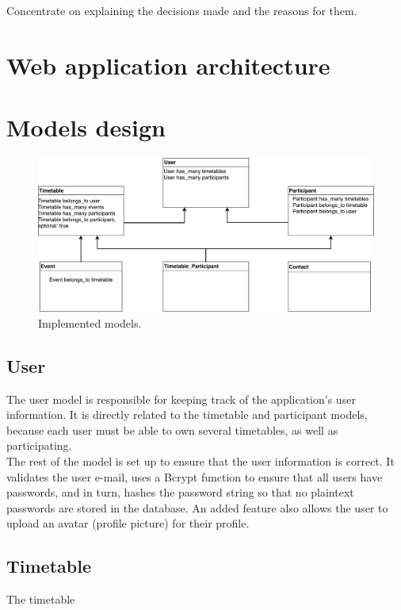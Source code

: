 Concentrate on explaining the decisions made and the reasons for them.
\section{Web application architecture}

\section{Models design}

\begin{figure}[H]
	\centering
    \includegraphics[trim={0 0 0 0},clip,width=1\textwidth]{Files/Models.pdf}
    \caption{Implemented models.}
    \label{fig: Models}
\end{figure}

\subsection{User}
The user model is responsible for keeping track of the application's user information. It is directly related to the timetable and participant models, because each user must be able to own several timetables, as well as participating.\\ 
The rest of the model is set up to ensure that the user information is correct. It validates the user e-mail, uses a Bcrypt function to ensure that all users have passwords, and in turn, hashes the password string so that no plaintext passwords are stored in the database. An added feature also allows the user to upload an avatar (profile picture) for their profile. 


\subsection{Timetable}
The timetable
